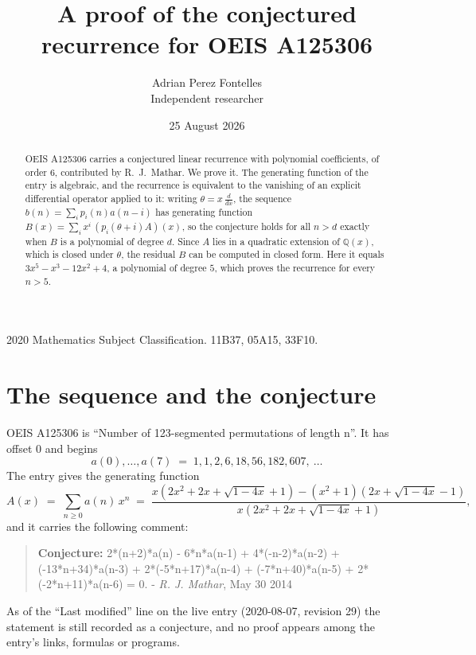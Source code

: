 \documentclass[11pt,a4paper]{article}
\title{A proof of the conjectured recurrence for OEIS A125306}
\author{Adrian Perez Fontelles\\ \small Independent researcher}
\date{25 August 2026}
\theoremstyle{plain}
\theoremstyle{definition}
\begin{document}
\maketitle

\begin{abstract}
OEIS A125306 carries a conjectured linear recurrence with polynomial coefficients, of
order 6, contributed by R.~J.~Mathar. We prove it. The generating function of the
entry is algebraic, and the recurrence is equivalent to the vanishing of an explicit
differential operator applied to it: writing $\theta=x\,\frac{d}{dx}$, the sequence
$b(n)=\sum_{i}p_{i}(n)a(n-i)$ has generating function
$B(x)=\sum_{i}x^{i}\,(p_{i}(\theta+i)A)(x)$, so the conjecture holds for all $n>d$ exactly
when $B$ is a polynomial of degree $d$. Since $A$ lies in a quadratic extension of
$\mathbb{Q}(x)$, which is closed under $\theta$, the residual $B$ can be computed in
closed form. Here it equals $3 x^{5} - x^{3} - 12 x^{2} + 4$, a polynomial of degree $5$, which proves
the recurrence for every $n>5$.
\end{abstract}

\noindent\small 2020 Mathematics Subject Classification. 11B37, 05A15, 33F10.\normalsize

\section{The sequence and the conjecture}

OEIS A125306 is ``Number of 123-segmented permutations of length n''. It has offset $0$ and begins
\[
a(0),\dots,a(7)\;=\;1, 1, 2, 6, 18, 56, 182, 607,\ \dots
\]
The entry gives the generating function
\begin{equation}\label{eq:gf}
A(x)\;=\;\sum_{n\ge 0} a(n)\,x^{n}\;=\;\frac{x \left(2 x^{2} + 2 x + \sqrt{1 - 4 x} + 1\right) - \left(x^{2} + 1\right) \left(2 x + \sqrt{1 - 4 x} - 1\right)}{x \left(2 x^{2} + 2 x + \sqrt{1 - 4 x} + 1\right)} ,
\end{equation}
and it carries the following comment:
\begin{quote}\small
\textbf{Conjecture:} 2*(n+2)*a(n) - 6*n*a(n-1) + 4*(-n-2)*a(n-2) + (-13*n+34)*a(n-3) + 2*(-5*n+17)*a(n-4) + (-7*n+40)*a(n-5) + 2*(-2*n+11)*a(n-6) = 0. - \emph{R. J. Mathar}, May 30 2014
\end{quote}
As of the ``Last modified'' line on the live entry (2020-08-07, revision 29) the
statement is still recorded as a conjecture, and no proof appears among the entry's links,
formulas or programs.
\end{document}
